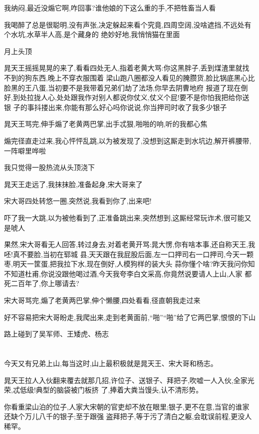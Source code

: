 ﻿\documentclass[12pt]{article}
\begin{document}
我纳闷,最近没煽它啊,咋回事?谁他娘的下这么重的手,不把牲畜当人看\dldots

我喝醉了总是很聪明,没有声张,决定躲起来看个究竟,四周空阔,没啥遮挡,不远处有个水坑,水草半人高,是个藏身的
绝妙好地,我悄悄猫在里面

月上头顶

晁天王摇摇晃晃的来了,看看四处无人,指着老黄大骂:你这黑胖子,丢到煤渣里就找不到的狗东西,晚上不穿衣服围着
梁山跑八圈都没人看见的腌臜货,脸比锅底黑心比脸黑的王八蛋,当初要不是我带着兄弟们劫了法场,你早去阴曹地府
报道了\dldots 现在倒好,到处拉拢人心,处处跟我作对\dldots 别人都说你仗义,仗义个屁!要不是你怕我把给你送银
子的事抖搂出来,你能有那么好心吗\dldots 你说说,你当押司时收了我多少银子\dldots

晁天王骂完,伸手煽了老黄两巴掌,出手忒狠,啪啪的响,听的我都心焦

煽完径直走过来,我心怦怦乱跳,以为被发现了,没想到这厮走到水坑边,解开裤腰带,一阵噼里哗啦\dldots

我只觉得一股热流从头顶浇下\dldots

晁天王走远了,我抹抹脸,准备起身,宋大哥来了

宋大哥四处转悠一圈,突然说,我看到你了,出来吧!

吓了我一大跳,以为被他看到了,正准备跳出来,突然想到,这厮经常玩诈术,很可能又是唬人

果然,宋大哥看无人回答,转过身去,对着老黄开骂:晁大愣,你有啥本事,还自称天王,我呸!真不要脸,当初在郓城
县,天天跟在我屁股后面,左一口押司右一口押司,今天一颗枣,明天一筐蛋,把我拉下水,现在倒好,人模狗样的装大头
蒜\dldots 你懂个啥?昨天我问你知不知道杜甫,你说没跟他喝过酒,今天我夸李白文采高,你竟然说要请人上山,人家
都死二百年了,你上哪请去?

宋大哥骂完,煽了老黄两巴掌,伸个懒腰,四处看看,径直朝我走过来

\dldots

好不容易把宋大哥盼走,我爬出来,走到老黄面前,``啪''``啪''给了它两巴掌,恨恨的下山

路上碰到了吴军师、王矮虎、杨志\dldots
\section{}

今天又有兄弟上山,每当这时,山上最积极就是晁天王、宋大哥和杨志。

晁天王拉人入伙翻来覆去就那几招,许位子、送银子、拜把子,吹嘘一人入伙,全家光荣,忒低级!典型的脑袋被门板挤
了,捧着大粪当馒头,认不清形势。

你看重梁山泊的位子,人家大宋朝的官吏却不放在眼里;银子,更不在意,当官的谁家还缺个万儿八千的银子;至于跟强
盗拜把子,等于污了清白之躯,会耽误前程,更没人稀罕。
\end{document}
